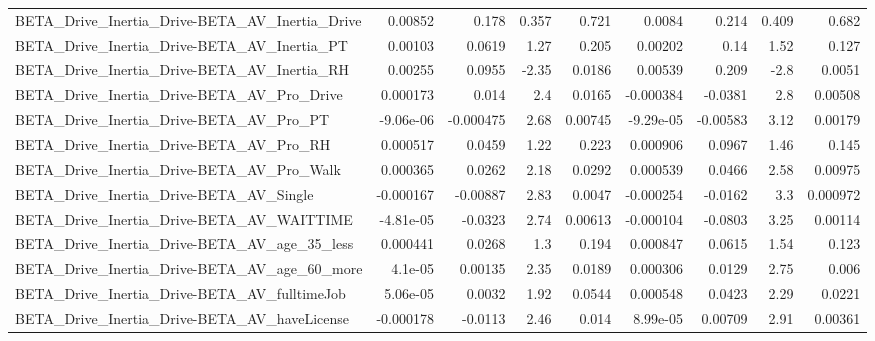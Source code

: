 \begin{tabular}{lrrrrrrrr}
BETA\_Drive\_Inertia\_Drive-BETA\_AV\_Inertia\_Drive     &     0.00852 &        0.178 &    0.357 &    0.721 &     0.0084 &       0.214 &        0.409 &         0.682 \\
BETA\_Drive\_Inertia\_Drive-BETA\_AV\_Inertia\_PT        &     0.00103 &       0.0619 &     1.27 &    0.205 &    0.00202 &        0.14 &         1.52 &         0.127 \\
BETA\_Drive\_Inertia\_Drive-BETA\_AV\_Inertia\_RH        &     0.00255 &       0.0955 &    -2.35 &   0.0186 &    0.00539 &       0.209 &         -2.8 &        0.0051 \\
BETA\_Drive\_Inertia\_Drive-BETA\_AV\_Pro\_Drive         &    0.000173 &        0.014 &      2.4 &   0.0165 &  -0.000384 &     -0.0381 &          2.8 &       0.00508 \\
BETA\_Drive\_Inertia\_Drive-BETA\_AV\_Pro\_PT            &   -9.06e-06 &    -0.000475 &     2.68 &  0.00745 &  -9.29e-05 &    -0.00583 &         3.12 &       0.00179 \\
BETA\_Drive\_Inertia\_Drive-BETA\_AV\_Pro\_RH            &    0.000517 &       0.0459 &     1.22 &    0.223 &   0.000906 &      0.0967 &         1.46 &         0.145 \\
BETA\_Drive\_Inertia\_Drive-BETA\_AV\_Pro\_Walk          &    0.000365 &       0.0262 &     2.18 &   0.0292 &   0.000539 &      0.0466 &         2.58 &       0.00975 \\
BETA\_Drive\_Inertia\_Drive-BETA\_AV\_Single            &   -0.000167 &     -0.00887 &     2.83 &   0.0047 &  -0.000254 &     -0.0162 &          3.3 &      0.000972 \\
BETA\_Drive\_Inertia\_Drive-BETA\_AV\_WAITTIME          &   -4.81e-05 &      -0.0323 &     2.74 &  0.00613 &  -0.000104 &     -0.0803 &         3.25 &       0.00114 \\
BETA\_Drive\_Inertia\_Drive-BETA\_AV\_age\_35\_less       &    0.000441 &       0.0268 &      1.3 &    0.194 &   0.000847 &      0.0615 &         1.54 &         0.123 \\
BETA\_Drive\_Inertia\_Drive-BETA\_AV\_age\_60\_more       &     4.1e-05 &      0.00135 &     2.35 &   0.0189 &   0.000306 &      0.0129 &         2.75 &         0.006 \\
BETA\_Drive\_Inertia\_Drive-BETA\_AV\_fulltimeJob       &    5.06e-05 &       0.0032 &     1.92 &   0.0544 &   0.000548 &      0.0423 &         2.29 &        0.0221 \\
BETA\_Drive\_Inertia\_Drive-BETA\_AV\_haveLicense       &   -0.000178 &      -0.0113 &     2.46 &    0.014 &   8.99e-05 &     0.00709 &         2.91 &       0.00361 \\

\end{tabular}
